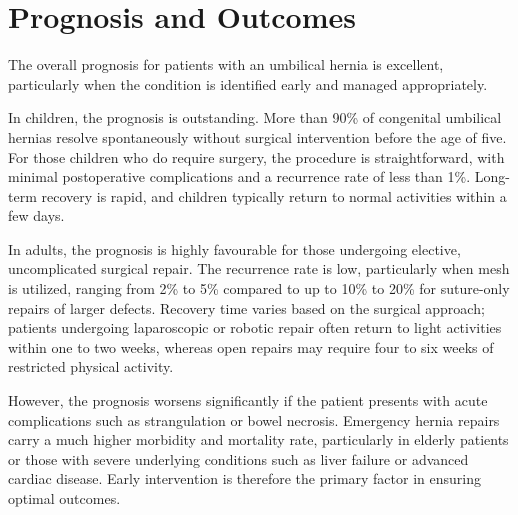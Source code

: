 \section*{Prognosis and Outcomes}
The overall prognosis for patients with an umbilical hernia is excellent, particularly when the condition is identified early and managed appropriately.

In children, the prognosis is outstanding. More than 90\% of congenital umbilical hernias resolve spontaneously without surgical intervention before the age of five. For those children who do require surgery, the procedure is straightforward, with minimal postoperative complications and a recurrence rate of less than 1\%. Long-term recovery is rapid, and children typically return to normal activities within a few days.

In adults, the prognosis is highly favourable for those undergoing elective, uncomplicated surgical repair. The recurrence rate is low, particularly when mesh is utilized, ranging from 2\% to 5\% compared to up to 10\% to 20\% for suture-only repairs of larger defects. Recovery time varies based on the surgical approach; patients undergoing laparoscopic or robotic repair often return to light activities within one to two weeks, whereas open repairs may require four to six weeks of restricted physical activity.

However, the prognosis worsens significantly if the patient presents with acute complications such as strangulation or bowel necrosis. Emergency hernia repairs carry a much higher morbidity and mortality rate, particularly in elderly patients or those with severe underlying conditions such as liver failure or advanced cardiac disease. Early intervention is therefore the primary factor in ensuring optimal outcomes.

